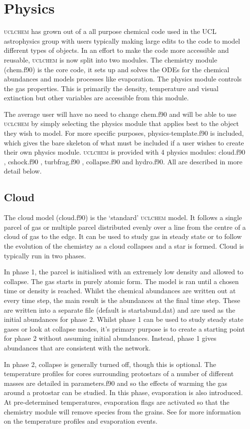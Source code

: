 \documentclass{llncs}
\begin{document}
\section{Physics}
\label{sec:physicsmods}
\textsc{uclchem} has grown out of a all purpose chemical code used in the UCL astrophysics group with users typically making large edits to the code to model different types of objects. In an effort to make the code more accessible and reusable, \textsc{uclchem} is now split into two modules. The chemistry module (chem.f90) is the core code, it sets up and solves the ODEs for the chemical abundances and models processes like evaporation. The physics module controls the gas properties. This is primarily the density, temperature and visual extinction but other variables are accessible from this module. \par
The average user will have no need to change chem.f90 and will be able to use \textsc{uclchem} by simply selecting the physics module that applies best to the object they wish to model. For more specific purposes, physics-template.f90 is included, which gives the bare skeleton of what must be included if a user wishes to create their own physics module. \textsc{uclchem} is provided with 4 physics modules: cloud.f90 \citep{viti2004}, cshock.f90 \citep{jimenez2008}, turbfrag.f90 \citep{Holdship2015}, collapse.f90 \citep{Priestley2018} and hydro.f90. All are described in more detail below.
%
\subsection{Cloud}
The cloud model (cloud.f90) is the `standard' \textsc{uclchem} model. It follows a single parcel of gas or multiple parcel distributed evenly over a line from the centre of a cloud of gas to the edge. It can be used to study gas in steady state or to follow the evolution of the chemistry as a cloud collapses and a star is formed. Cloud is typically run in two phases. \par
In phase 1, the parcel is initialised with an extremely low density and allowed to collapse. The gas starts in purely atomic form. The model is ran until a chosen time or density is reached. Whilst the chemical abundances are written out at every time step, the main result is the abundances at the final time step. These are written into a separate file (default is startabund.dat) and are used as the initial abundances for phase 2. Whilst phase 1 can be used to study steady state gases or look at collapse modes, it's primary purpose is to create a starting point for phase 2 without assuming initial abundances. Instead, phase 1 gives abundances that are consistent with the network.\par
In phase 2, collapse is generally turned off, though this is optional. The temperature profiles for cores surrounding protostars of a number of different masses are detailed in parameters.f90 and so the effects of warming the gas around a protostar can be studied. In this phase, evaporation is also introduced. At pre-determined temperatures, evaporation flags are activated so that the chemistry module will remove species from the grains. See \citet{viti2004} for more information on the temperature profiles and evaporation events.
%
\end{document}
